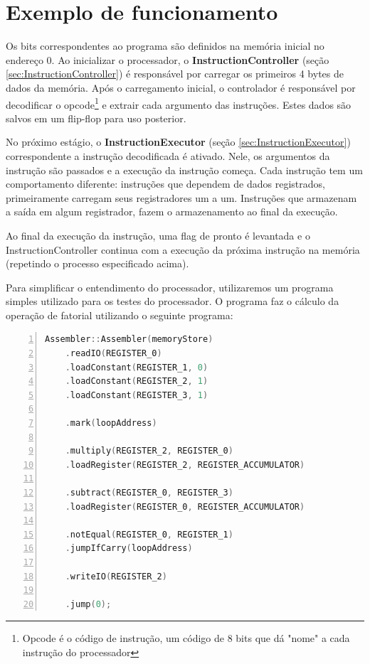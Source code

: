 \documentclass[11pt]{report}
\begin{document}
\section{Exemplo de funcionamento}

Os bits correspondentes ao programa são definidos na memória inicial no endereço $0$. Ao inicializar o processador, o \textbf{InstructionController} (seção \ref{sec:InstructionController}) é responsável por carregar os primeiros 4 bytes de dados da memória. Após o carregamento inicial, o controlador é responsável por decodificar o opcode\footnote{Opcode é o código de instrução, um código de 8 bits que dá "nome" a cada instrução do processador} e extrair cada argumento das instruções. Estes dados são salvos em um flip-flop para uso posterior.

No próximo estágio, o \textbf{InstructionExecutor} (seção \ref{sec:InstructionExecutor}) correspondente a instrução decodificada é ativado. Nele, os argumentos da instrução são passados e a execução da instrução começa. Cada instrução tem um comportamento diferente: instruções que dependem de dados registrados, primeiramente carregam seus registradores um a um. Instruções que armazenam a saída em algum registrador, fazem o armazenamento ao final da execução.

Ao final da execução da instrução, uma flag de pronto é levantada e o InstructionController continua com a execução da próxima instrução na memória (repetindo o processo especificado acima).

Para simplificar o entendimento do processador, utilizaremos um programa simples utilizado para os testes do processador. O programa faz o cálculo da operação de fatorial utilizando o seguinte programa:

\begin{lstlisting}[language=C++,caption={Exemplo de código utilizado pelo Assembler},stepnumber=1,numbers=left,showlines=true]
Assembler::Assembler(memoryStore)
	.readIO(REGISTER_0)
	.loadConstant(REGISTER_1, 0)
	.loadConstant(REGISTER_2, 1)
	.loadConstant(REGISTER_3, 1)

	.mark(loopAddress)

	.multiply(REGISTER_2, REGISTER_0)
	.loadRegister(REGISTER_2, REGISTER_ACCUMULATOR)

	.subtract(REGISTER_0, REGISTER_3)
	.loadRegister(REGISTER_0, REGISTER_ACCUMULATOR)

	.notEqual(REGISTER_0, REGISTER_1)
	.jumpIfCarry(loopAddress)

	.writeIO(REGISTER_2)

	.jump(0);
\end{lstlisting}
\end{document}
